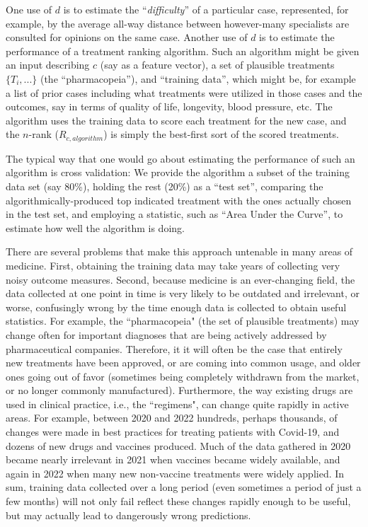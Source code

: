 \documentclass{article}
\begin{document}
One use of $d$ is to estimate the ``\emph{difficulty}'' of a particular case, represented, for example, by the average all-way distance between however-many specialists are consulted for opinions on the same case. Another use of $d$ is to estimate the performance of a treatment ranking algorithm. Such an algorithm might be given an input describing $c$ (say as a feature vector), a set of plausible treatments $\{T_i,...\}$ (the ``pharmacopeia''), and ``training data'', which might be, for example a list of prior cases including what treatments were utilized in those cases and the outcomes, say in terms of quality of life, longevity, blood pressure, etc. The algorithm uses the training data to score each treatment for the new case, and the $n$-rank ($R_{c,algorithm}$) is simply the best-first sort of the scored treatments. 

The typical way that one would go about estimating the performance of such an algorithm is cross validation: We provide the algorithm a subset of the training data set (say 80\%), holding the rest (20\%) as a ``test set'', comparing the algorithmically-produced top indicated treatment with the ones actually chosen in the test set, and employing a statistic, such as ``Area Under the Curve'', to estimate how well the algorithm is doing.   

There are several problems that make this approach untenable in many areas of medicine. First, obtaining the training data may take years of collecting very noisy outcome measures. Second, because medicine is an ever-changing field, the data collected at one point in time is very likely to be outdated and irrelevant, or worse, confusingly wrong by the time enough data is collected to obtain useful statistics. For example, the ``pharmacopeia" (the set of plausible treatments) may change often for important diagnoses that are being actively addressed by pharmaceutical companies. Therefore, it it will often be the case that entirely new treatments have been approved, or are coming into common usage, and older ones going out of favor (sometimes being completely withdrawn from the market, or no longer commonly manufactured). Furthermore, the way existing drugs are used in clinical practice, i.e., the ``regimens", can change quite rapidly in active areas. For example, between 2020 and 2022 hundreds, perhaps thousands, of changes were made in best practices for treating patients with Covid-19, and dozens of new drugs and vaccines produced. Much of the data gathered in 2020 became nearly irrelevant in 2021 when vaccines became widely available, and again in 2022 when many new non-vaccine treatments were widely applied. In sum, training data collected over a long period (even sometimes a period of just a few months) will not only fail reflect these changes rapidly enough to be useful, but may actually lead to dangerously wrong predictions. 
\end{document}
